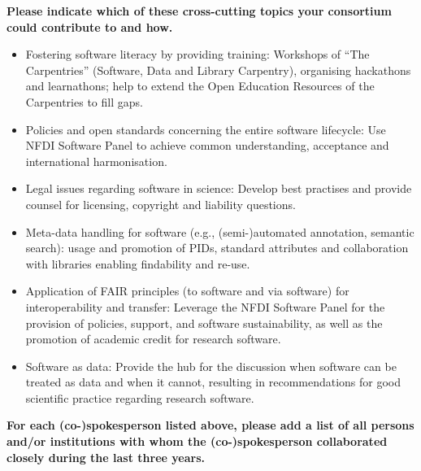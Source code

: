 \documentclass[11pt,a4paper,DIV=11]{scrlttr2}
\begin{document}
\begin{letter}{}
\vspace{1em}
\textbf{Please indicate which of these cross-cutting topics your consortium could contribute to and how.}\\
\begin{itemize}
\item Fostering software literacy by providing training: Workshops of  “The Carpentries” (Software, Data and Library Carpentry), organising hackathons and learnathons; help to extend the Open Education Resources of the Carpentries to fill gaps.
\item Policies and open standards concerning the entire software lifecycle: Use NFDI Software Panel to achieve common understanding, acceptance and international harmonisation.
\item Legal issues regarding software in science: Develop best practises and provide counsel for licensing, copyright and liability questions.
\item Meta-data handling for software (e.g., (semi-)automated annotation, semantic search): usage and promotion of PIDs, standard attributes and collaboration with libraries enabling findability and re-use.
\item Application of FAIR principles (to software and via software) for interoperability and transfer: Leverage the NFDI Software Panel for the provision of policies, support, and software sustainability, as well as the promotion of academic credit for research software.
\item Software as data: Provide the hub for the discussion when software can be treated as data and when it cannot, resulting in recommendations for good scientific practice regarding research software.
\end{itemize}

\clearpage
{}

\textbf{For each (co-)spokesperson listed above, please add a list of all persons and/or
institutions with whom the (co-)spokesperson collaborated closely during the last
three years.}\\



\end{letter}
\end{document}
